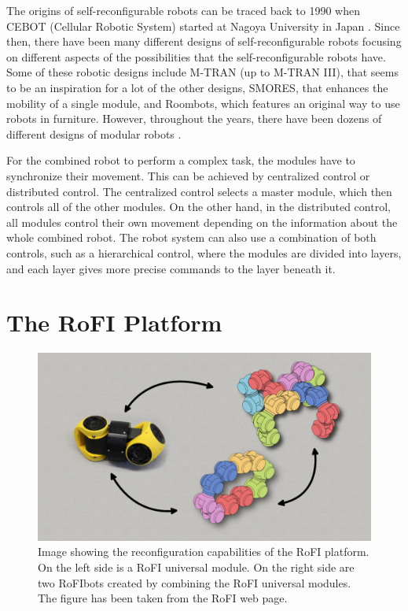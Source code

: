 \documentclass[
  printed, %
  color,   %
  notable, %
  oneside, %
  nolof,   %
  nolot,   %
  nocover,
]{fithesis3}
\begin{document}
The origins of self-reconfigurable robots can be traced back to 1990 when CEBOT (Cellular Robotic System) started at Nagoya University in Japan \cite{current-trends}.
Since then, there have been many different designs of self-reconfigurable robots focusing on different aspects of the possibilities that the self-reconfigurable robots have.
Some of these robotic designs include M-TRAN (up to M-TRAN III)\cite{mtran}, that seems to be an inspiration for a lot of the other designs, SMORES\cite{smores}, that enhances the mobility of a single module, and Roombots\cite{roombots}, which features an original way to use robots in furniture.
However, throughout the years, there have been dozens of different designs of modular robots \cite{current-trends}.

For the combined robot to perform a complex task, the modules have to synchronize their movement.
This can be achieved by centralized control or distributed control.
The centralized control selects a master module, which then controls all of the other modules.
On the other hand, in the distributed control, all modules control their own movement depending on the information about the whole combined robot.
The robot system can also use a combination of both controls, such as a hierarchical control, where the modules are divided into layers, and each layer gives more precise commands to the layer beneath it.


\chapter{The RoFI Platform}

\begin{figure}
    \centering
    \includegraphics[width=\linewidth]{data/rofi_transformation.jpg}
    \caption{Image showing the reconfiguration capabilities of the RoFI platform. On the left side is a RoFI universal module. On the right side are two RoFIbots created by combining the RoFI universal modules. The figure has been taken from the RoFI web page\cite{rofi-web}.}
    \label{fig:rofi-transform}
\end{figure}
\end{document}
